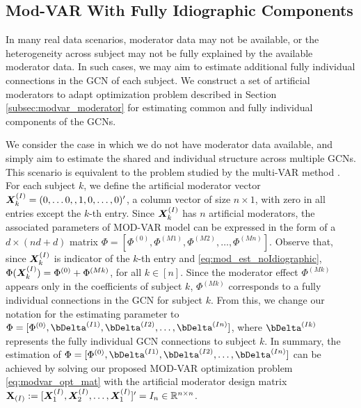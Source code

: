 \subsection{Mod-VAR With Fully Idiographic Components}\label{subsec:modvar_idiographic}

In many real data scenarios, moderator data may not be available, or the heterogeneity across subject may not be fully explained by the available moderator data. In such cases, we may aim to estimate additional fully individual connections in the GCN of each subject.  We construct a set of artificial moderators to adapt optimization problem described in Section \ref{subsec:modvar_moderator} for estimating common and fully individual components of the GCNs.

We consider the case in which we do not have moderator data available, and simply aim to estimate the shared and individual structure across multiple GCNs. This scenario is equivalent to the problem studied by the multi-VAR method \citep{fisher2022penalized}. For each subject $k$, we define the artificial moderator vector $\bm{X}_k^{(I)} = (0,\ldots 0,,1,0,\ldots , 0)'$, a column vector of size $n\times 1$, with zero in all entries except the $k$-th entry. Since $\bm{X}_k^{(I)}$ has $n$ artificial moderators, the associated parameters of MOD-VAR model can be expressed in the form of a $d\times (nd+d)$ matrix $\Phi = [\Phi^{(0)},\Phi^{(M1)},\Phi^{(M2)}, \ldots , \Phi^{(Mn)}]$. Observe that, since $\bm{X}^{(I)}_k$ is indicator of the $k$-th entry and  \eqref{eq:mod_est_noIdiographic}, $\Phi(\bm{X}_k^{(I)}) = \Phi^{(0)} + \Phi^{(Mk)}$,  for all $k\in[n]$. Since the moderator effect $\Phi^{(Mk)}$ appears only in the coefficients of subject $k$, $\Phi^{(Mk)}$ corresponds to a fully individual connections in the GCN for subject $k$. From this, we change our notation for the estimating parameter to $\Phi = [\Phi^{(0)},\bDelta^{(I1)},\bDelta^{(I2)}, \ldots , \bDelta^{(In)}]$, where $\bDelta^{(Ik)}$ represents the fully individual GCN connections to subject $k$. In summary, the estimation of $\Phi = [\Phi^{(0)},\bDelta^{(I1)},\bDelta^{(I2)}, \ldots , \bDelta^{(In)}]$ can be achieved by solving our proposed  MOD-VAR optimization problem \eqref{eq:modvar_opt_mat} with the artificial moderator design matrix $\mathbf{X}_{(I)} := [\bm{X}^{(I)}_1, \bm{X}^{(I)}_2, \ldots, \bm{X}^{(I)}_1]' = I_n\in\mathbb{R}^{n\times n}$.


